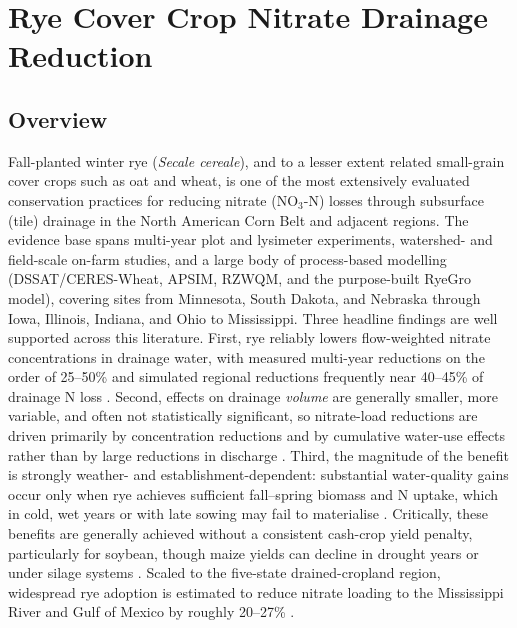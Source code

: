 \documentclass[11pt]{article}
\begin{document}
\section*{Rye Cover Crop Nitrate Drainage Reduction}

\subsection{Overview}
Fall-planted winter rye (\emph{Secale cereale}), and to a lesser extent related small-grain cover crops such as oat and wheat, is one of the most extensively evaluated conservation practices for reducing nitrate (NO$_3$-N) losses through subsurface (tile) drainage in the North American Corn Belt and adjacent regions. The evidence base spans multi-year plot and lysimeter experiments, watershed- and field-scale on-farm studies, and a large body of process-based modelling (DSSAT/CERES-Wheat, APSIM, RZWQM, and the purpose-built RyeGro model), covering sites from Minnesota, South Dakota, and Nebraska through Iowa, Illinois, Indiana, and Ohio to Mississippi. Three headline findings are well supported across this literature. First, rye reliably lowers flow-weighted nitrate concentrations in drainage water, with measured multi-year reductions on the order of 25--50\% and simulated regional reductions frequently near 40--45\% of drainage N loss \parencite{Kaspar2012,Malone2018,Feyereisen2006b,Malone2014b}. Second, effects on drainage \emph{volume} are generally smaller, more variable, and often not statistically significant, so nitrate-load reductions are driven primarily by concentration reductions and by cumulative water-use effects rather than by large reductions in discharge \parencite{Kaspar2012,MartinezFeria2016,Waring2020,Qi2011b}. Third, the magnitude of the benefit is strongly weather- and establishment-dependent: substantial water-quality gains occur only when rye achieves sufficient fall--spring biomass and N uptake, which in cold, wet years or with late sowing may fail to materialise \parencite{Bawa2023,Strock2004,Feyereisen2006b,Birru2023}. Critically, these benefits are generally achieved without a consistent cash-crop yield penalty, particularly for soybean, though maize yields can decline in drought years or under silage systems \parencite{Strock2004,Qi2011b,Malone2020,MartinezFeria2016,Krueger2013}. Scaled to the five-state drained-cropland region, widespread rye adoption is estimated to reduce nitrate loading to the Mississippi River and Gulf of Mexico by roughly 20--27\% \parencite{Kladivko2014,Malone2023}.
\end{document}
